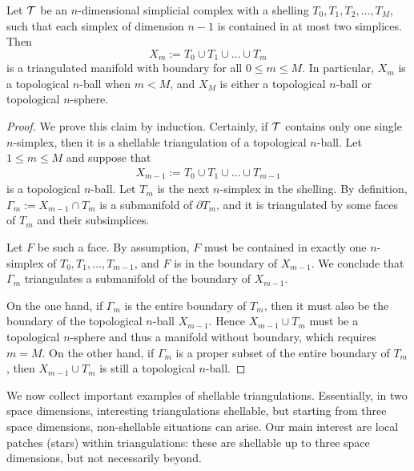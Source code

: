 \documentclass[10pt,a4paper]{article}
\begin{document}
\begin{lemma}\label{lemma:shell_triang_man}
    Let ${\mathcal T}$ be an $n$-dimensional simplicial complex 
    with a shelling $T_{0}, T_{1}, T_{2}, \dots, T_{M}$,
    such that each simplex of dimension $n-1$ is contained in at most two simplices. 
    Then
    $$
        X_{m} := T_{0} \cup T_{1} \cup \dots \cup T_{m}
    $$ 
    is a triangulated manifold with boundary for all $0 \leq m \leq M$.
    In particular, $X_{m}$ is a topological $n$-ball when $m < M$, 
    and 
    $X_{M}$ is either a topological $n$-ball or topological $n$-sphere. 
\end{lemma}
\begin{proof}  
    We prove this claim by induction. 
    Certainly, if ${\mathcal T}$ contains only one single $n$-simplex, then it is a shellable triangulation of a topological $n$-ball. Let $1 \leq m \leq M$ and suppose that 
    \begin{align*}
        X_{m-1} := T_{0} \cup T_{1} \cup \dots \cup T_{m-1}
    \end{align*}
    is a topological $n$-ball. Let $T_{m}$ is the next $n$-simplex in the shelling.
    By definition, $\Gamma_{m} := X_{m-1} \cap T_{m}$ is a submanifold of $\partial T_{m}$,
    and it is triangulated by some faces of $T_{m}$ and their subsimplices. 
    
    Let $F$ be such a face. 
    By assumption, $F$ must be contained in exactly one $n$-simplex of $T_{0}, T_{1}, \dots, T_{m-1}$,
    and $F$ is in the boundary of $X_{m-1}$. 
    We conclude that $\Gamma_{m}$ triangulates a submanifold of the boundary of $X_{m-1}$.
    
    On the one hand, 
    if $\Gamma_{m}$ is the entire boundary of $T_{m}$, 
    then it must also be the boundary of the topological $n$-ball $X_{m-1}$. 
    Hence $X_{m-1} \cup T_{m}$ must be a topological $n$-sphere and thus a manifold without boundary, 
    which requires $m = M$.
    On the other hand, 
    if $\Gamma_{m}$ is a proper subset of the entire boundary of $T_{m}$, 
    then $X_{m-1} \cup T_{m}$ is still a topological $n$-ball.
\end{proof}


We now collect important examples of shellable triangulations. Essentially, in two space dimensions, interesting triangulations shellable, but starting from three space dimensions, non-shellable situations can arise. Our main interest are local patches (stars) within triangulations: these are shellable up to three space dimensions, but not necessarily beyond. 
\end{document}
